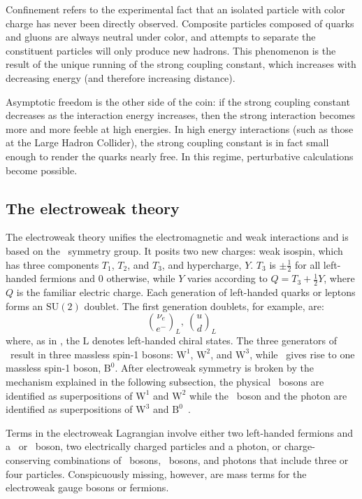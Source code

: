 Confinement refers to the experimental fact that an isolated particle with color charge has never been directly observed. Composite particles composed of quarks and gluons are always neutral under color, and attempts to separate the constituent particles will only produce new hadrons. This phenomenon is the result of the unique running of the strong coupling constant, which increases with decreasing energy (and therefore increasing distance).

Asymptotic freedom is the other side of the coin: if the strong coupling constant decreases as the interaction energy increases, then the strong interaction becomes more and more feeble at high energies. In high energy interactions (such as those at the Large Hadron Collider), the strong coupling constant is in fact small enough to render the quarks nearly free. In this regime, perturbative calculations become possible.

\subsection{The electroweak theory}
The electroweak theory unifies the electromagnetic and weak interactions and is based on the \ewsymm\ symmetry group. It posits two new charges: weak isospin, which has three components $T_{1}$, $T_{2}$, and $T_{3}$, and hypercharge, $Y$. $T_{3}$ is $\pm\frac{1}{2}$ for all left-handed fermions and 0 otherwise, while $Y$ varies according to $Q=T_{3}+\frac{1}{2}Y$, where $Q$ is the familiar electric charge. Each generation of left-handed quarks or leptons forms an $\mathrm{SU}(2)$ doublet. The first generation doublets, for example, are:
\begin{equation}
    \binom{\nu_{e}}{e^{-}}_{L},\ \binom{u}{d}_{L}
\end{equation}
where, as in \sutwol, the $\mathrm{L}$ denotes left-handed chiral states. The three generators of \sutwol\ result in three massless spin-1 bosons: $\mathrm{W}^{1}$, $\mathrm{W}^{2}$, and $\mathrm{W}^{3}$, while \uoney\ gives rise to one massless spin-1 boson, $\mathrm{B}^{0}$. After electroweak symmetry is broken by the mechanism explained in the following subsection, the physical \PWpm\ bosons are identified as superpositions of $\mathrm{W}^{1}$ and $\mathrm{W}^{2}$ while the \cPZ\ boson and the photon are identified as superpositions of $\mathrm{W}^{3}$ and $\mathrm{B}^{0}$~\cite{weinberg_leptons}.

Terms in the electroweak Lagrangian involve either two left-handed fermions and a \PWpm\ or \cPZ\ boson, two electrically charged particles and a photon, or charge-conserving combinations of \PWpm\ bosons, \cPZ\ bosons, and photons that include three or four particles. Conspicuously missing, however, are mass terms for the electroweak gauge bosons or fermions.

